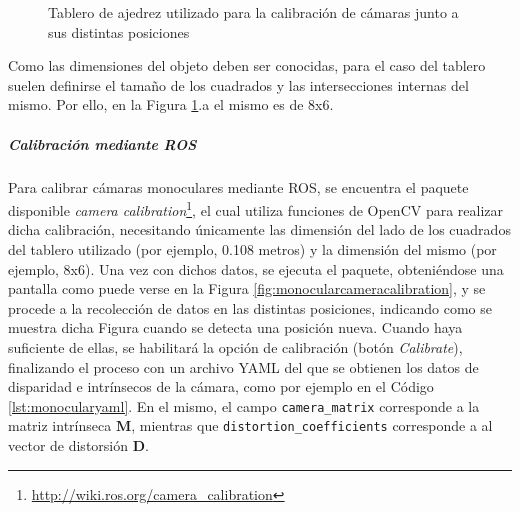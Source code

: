 \begin{figure}
    \centering
    \qquad
    \caption{Tablero de ajedrez utilizado para la calibración de cámaras junto a sus distintas posiciones}
    \label{fig:chessboardcalibration}
\end{figure}

Como las dimensiones del objeto deben ser conocidas, para el caso del tablero suelen definirse el tamaño de los cuadrados y las intersecciones internas del mismo. Por ello, en la Figura \ref{fig:chessboardcalibration}.a el mismo es de 8x6.

\subparagraph{Calibración mediante ROS}
Para calibrar cámaras monoculares mediante ROS, se encuentra el paquete disponible \textit{camera calibration}\footnote{\url{http://wiki.ros.org/camera_calibration}}, el cual utiliza funciones de OpenCV para realizar dicha calibración, necesitando únicamente las dimensión del lado de los cuadrados del tablero utilizado (por ejemplo, 0.108 metros) y la dimensión del mismo (por ejemplo, 8x6). Una vez con dichos datos, se ejecuta el paquete, obteniéndose una pantalla como puede verse en la Figura \ref{fig:monocularcameracalibration}, y se procede a la recolección de datos en las distintas posiciones, indicando como se muestra dicha Figura cuando se detecta una posición nueva. Cuando haya suficiente de ellas, se habilitará la opción de calibración (botón \textit{Calibrate}), finalizando el proceso con un archivo YAML del que se obtienen los datos de disparidad e intrínsecos de la cámara, como por ejemplo en el Código \ref{lst:monocularyaml}. En el mismo, el campo \texttt{camera\_matrix} corresponde a la matriz intrínseca $\bm{M}$, mientras que \texttt{distortion\_coefficients} corresponde a al vector de distorsión $\bm{D}$.

